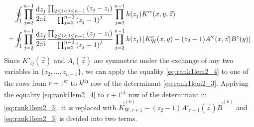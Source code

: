 \documentclass[cmp]{svjour}
\numberwithin{theorem}{section}
\numberwithin{equation}{section}
\def\dd{{\rm d}}
\def\ii{{\rm i}}
\begin{document}
\begin{equation}\label{eq:rank1lem2_4}
\begin{split}
& \oint_{1} \prod_{j=2}^{n-1}{ \frac{ \dd z_j}{2 \pi \ii} } \frac{ \prod_{2 \leq i < j \leq n-1}{(z_j - z_i)} }{ \prod_{j=2}^{n-1}{{(z_j -1)}^{j}} } \prod_{j=2}^{n-1}{h(z_j)} K'^c(x ,y , \vec{z}) \\
= & \oint_{1} \prod_{j=2}^{n-1}{ \frac{\dd z_j}{2 \pi \ii} } \frac{ \prod_{2 \leq i < j \leq n-1}{(z_j - z_i)} }{ \prod_{j=2}^{n-1}{{(z_j -1)}^{j}} } \prod_{j=2}^{n-1}{h(z_j)} \left[ K_{\mathrm{W}}^c(x , y) -  (z_2 - 1) A'^c(x, \vec{z}) B^c(y) \right]
 \end{split}
\end{equation}
Since $K'_{ij}(\vec{z}) $ and $A_i(\vec{z})$ are symmetric under the exchange of any two variables in $\{ z_2,\ldots,z_{n-1} \}$, we can apply the equality \eqref{eq:rank1lem2_4} to one of the rows from $r +1$\textsuperscript{st}  to $k$\textsuperscript{th} row of the determinant \eqref{eq:rank1lem2_3}.
Applying the equality \eqref{eq:rank1lem2_4} to $r +1$\textsuperscript{st} row of the determinant in \eqref{eq:rank1lem2_3}, it is replaced with $\vec{K}^{(k)}_{\mathrm{W},r +1} - (z_2 - 1) A'_{r +1}(\vec{z}) \vec{B}^{(k)}$ and \eqref{eq:rank1lem2_3} is divided into two terms.
\end{document}
